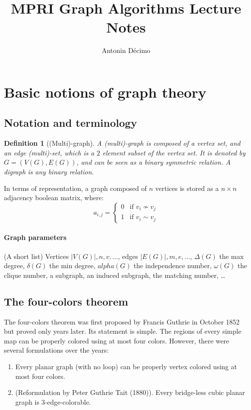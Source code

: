 \documentclass[12pt,a4paper]{article}
\title{MPRI Graph Algorithms Lecture Notes}
\author{Antonin Décimo}
\newtheorem{definition}{Definition}
\begin{document}
\maketitle
\tableofcontents

\section{Basic notions of graph theory}

\subsection{Notation and terminology}

\begin{definition}[(Multi)-graph] A (multi)-graph is composed of a vertex set,
  and an edge (multi)-set, which is a \(2\) element subset of the vertex set.
  It is denoted by \(G = (V(G), E(G))\), and can be seen as a binary symmetric
  relation.  A digraph is any binary relation.
\end{definition}

In terms of representation, a graph composed of \(n\) vertices is stored as a
\(n \times n\) adjacency boolean matrix, where:
\[a_{i, j} = \begin{cases}
    0 & \text{if } v_i \not\sim v_j\\
    1 & \text{if } v_i \sim v_j
  \end{cases}\]

\paragraph{Graph parameters} (A short list) Vertices \(|V(G)|, n, v, \dots\),
edges \(|E(G)|, m, e, \dots\), \(\Delta(G)\) the max degree, \(\delta(G)\) the
min degree, \(alpha(G)\) the independence number, \(\omega(G)\) the clique
number, a subgraph, an induced subgraph, the matching number, …

\subsection{The four-colors theorem}
The four-colors theorem was first proposed by Francis Guthrie in October 1852
but proved only years later.  Its statement is simple.  The regions of every
simple map can be properly colored using at most four colors.  However, there
were several formulations over the years:

\begin{enumerate}
\item Every planar graph (with no loop) can be properly vertex colored using at
most four colors.
\item (Reformulation by Peter Guthrie Tait (1880)). Every bridge-less cubic
  planar graph is 3-edge-colorable.
\end{enumerate}
\end{document}
